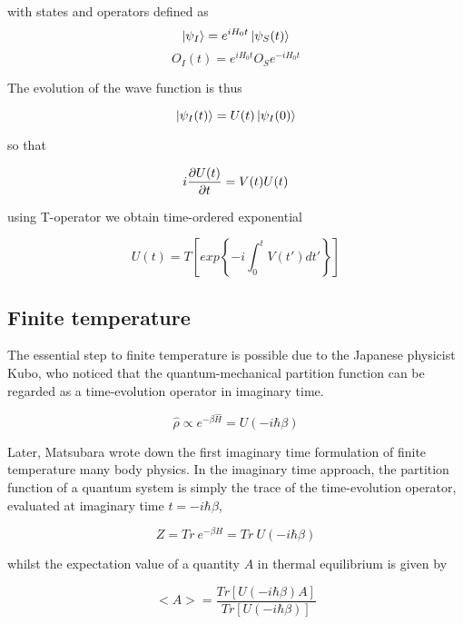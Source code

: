 with states and operators defined as
\begin{equation} \ket{\psi_I} = e^{i H_0 t}\ket{\psi_S(t)} \end{equation}
\begin{equation} O_I(t) = e^{i H_0 t} O_S e^{-i H_0 t} \end{equation} 

The evolution of the wave function is thus

\begin{equation} \ket{\psi_I(t)} = U(t) \ket{\psi_I(0)} \end{equation}

so that

\begin{equation} i\frac{\partial U(t)}{\partial t} = V(t) U(t) \end{equation}

using T-operator we obtain time-ordered exponential

\begin{equation} U(t) = T\left[exp\left\{-i\int_{0}^{t}V(t')dt'\right\}\right] \end{equation}

\subsection{Finite temperature}
The essential step to finite temperature is possible due to the Japanese physicist Kubo, who noticed
that the quantum-mechanical partition function can be regarded as a time-evolution operator in imaginary time.

\begin{equation} \hat{\rho} \propto e^{-\beta \hat{H}} = U(-i\hbar\beta) \end{equation}

Later, Matsubara wrote down the first imaginary time formulation of finite temperature many body physics.
In the imaginary time approach, the partition function of a quantum system is simply the trace 
of the time-evolution operator, evaluated at imaginary time $t = -i\hbar\beta$,

\begin{equation} Z = Tr\ e^{-\beta H} = Tr\ U(-i\hbar\beta)\end{equation}

whilst the expectation value of a quantity $A$ in thermal equilibrium is given by

\begin{equation} <A> = \frac{Tr[U(-i\hbar\beta)A]}{Tr[U(-i\hbar\beta)]} \end{equation}

